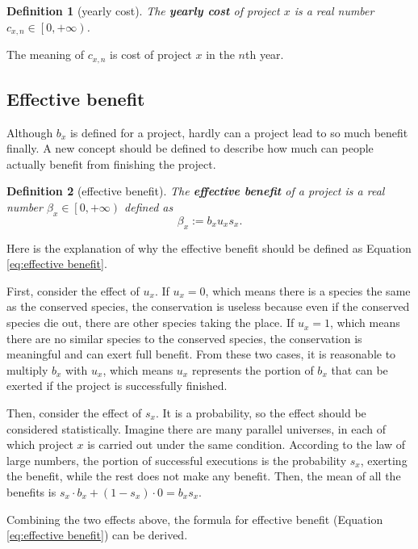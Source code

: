 \documentclass{article}
\newtheorem{definition}{Definition}
\begin{document}
\begin{definition}[yearly cost]
The \textbf{yearly cost} of project $x$ is a real number $c_{x,n}\in\left[0,+\infty\right)$.
\end{definition}

The meaning of $c_{x,n}$ is cost of project $x$ in the $n$th year.

\subsection{Effective benefit}
\label{sec:effective benefit}

Although $b_x$ is defined for a project, hardly can a project lead to so much benefit finally.
A new concept should be defined to describe how much can people actually benefit from finishing the project.

\begin{definition}[effective benefit]
The \textbf{effective benefit} of a project is a real number $\beta_x\in\left[0,+\infty\right)$ defined as
\begin{equation}
\label{eq:effective benefit}
\beta_x:=b_xu_xs_x.
\end{equation}
\end{definition}

Here is the explanation of why the effective benefit should be defined as Equation \ref{eq:effective benefit}.

First, consider the effect of $u_x$.
If $u_x=0$, which means there is a species the same as the conserved species,
the conservation is useless because even if the conserved species die out, there are other species taking the place.
If $u_x=1$, which means there are no similar species to the conserved species,
the conservation is meaningful and can exert full benefit.
From these two cases, it is reasonable to multiply $b_x$ with $u_x$,
which means $u_x$ represents the portion of $b_x$ that can be exerted if the project is successfully finished.

Then, consider the effect of $s_x$.
It is a probability, so the effect should be considered statistically.
Imagine there are many parallel universes, in each of which project $x$ is carried out under the same condition.
According to the law of large numbers, the portion of successful executions is the probability $s_x$, exerting the benefit,
while the rest does not make any benefit.
Then, the mean of all the benefits is $s_x\cdot b_x+\left(1-s_x\right)\cdot0=b_xs_x$.

Combining the two effects above, the formula for effective benefit (Equation \ref{eq:effective benefit}) can be derived.
\end{document}
